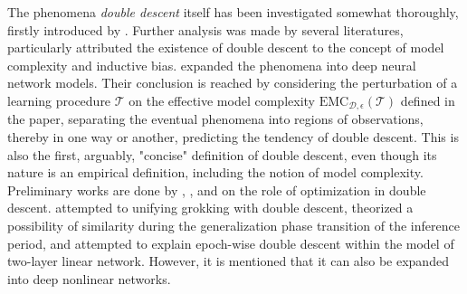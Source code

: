 \documentclass[10pt]{article}
\begin{document}
The phenomena \textit{double descent} itself has been investigated somewhat thoroughly, firstly introduced by \cite{belkin_reconciling_2019}. Further analysis was made by several literatures, particularly attributed the existence of double descent to the concept of model complexity and inductive bias. \cite{nakkiran_deep_2019} expanded the phenomena into deep neural network models. Their conclusion is reached by considering the perturbation of a learning procedure $\mathcal{T}$ on the effective model complexity $\mathrm{EMC}_{\mathcal{D},\epsilon}(\mathcal{T})$ defined in the paper, separating the eventual phenomena into regions of observations, thereby in one way or another, predicting the tendency of double descent. This is also the first, arguably, "concise" definition of double descent, even though its nature is an empirical definition, including the notion of model complexity. Preliminary works are done by \cite{lafon_understanding_2024}, \cite{schaeffer_double_2023}, and \cite{liu2023understandingroleoptimizationdouble} on the role of optimization in double descent. \cite{davies_unifying_2023} attempted to unifying grokking with double descent, theorized a possibility of similarity during the generalization phase transition of the inference period, and \cite{olmin2024understandingepochwisedoubledescent} attempted to explain epoch-wise double descent within the model of two-layer linear network. However, it is mentioned that it can also be expanded into deep nonlinear networks. 
\end{document}
